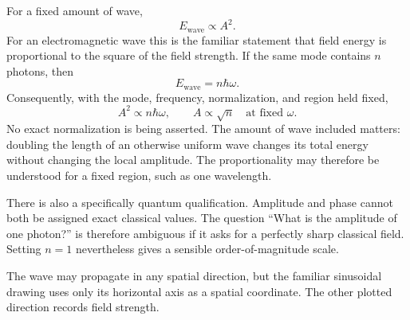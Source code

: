 For a fixed amount of wave,
\begin{equation}
E_{\text{wave}}\propto A^2.
\end{equation}
For an electromagnetic wave this is the familiar statement that field energy is proportional to the square of the field strength. If the same mode contains \(n\) photons, then
\begin{equation}
E_{\text{wave}}=n\hbar\omega.
\end{equation}
Consequently, with the mode, frequency, normalization, and region held fixed,
\begin{equation}
A^2\propto n\hbar\omega,
\qquad
A\propto\sqrt n\quad\text{at fixed }\omega.
\end{equation}
No exact normalization is being asserted. The amount of wave included matters: doubling the length of an otherwise uniform wave changes its total energy without changing the local amplitude. The proportionality may therefore be understood for a fixed region, such as one wavelength.

There is also a specifically quantum qualification. Amplitude and phase cannot both be assigned exact classical values. The question ``What is the amplitude of one photon?'' is therefore ambiguous if it asks for a perfectly sharp classical field. Setting \(n=1\) nevertheless gives a sensible order-of-magnitude scale.

\begin{classroomqa}
\end{classroomqa}

The wave may propagate in any spatial direction, but the familiar sinusoidal drawing uses only its horizontal axis as a spatial coordinate. The other plotted direction records field strength.

\begin{classroomqa}
\end{classroomqa}

